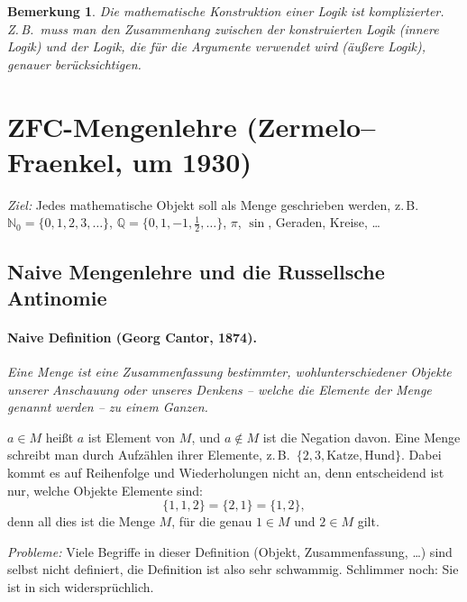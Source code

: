 \documentclass[a4paper]{article}
\theoremstyle{kurzskript}
\newtheorem*{bem}{Bemerkung}
\newcommand{\N}{\mathbb{N}}
\newcommand{\Q}{\mathbb{Q}}
\begin{document}
\begin{bem}
Die mathematische Konstruktion einer Logik ist komplizierter. Z.\,B.\ muss man den Zusammenhang zwischen der konstruierten Logik (\emph{innere Logik}) und der Logik, die für die Argumente verwendet wird (\emph{äußere Logik}), genauer berücksichtigen.
\end{bem}

\section{ZFC-Mengenlehre (Zermelo--Fraenkel, um 1930)}

\emph{Ziel:} Jedes mathematische Objekt soll als Menge geschrieben werden, z.\,B.\ $\N_0 = \{0, 1, 2, 3, \dots\}$, $\Q = \{0, 1, -1, \frac12, \dots\}$, $\pi$, $\sin$, Geraden, Kreise, \dots

\subsection{Naive Mengenlehre und die Russellsche Antinomie}

\paragraph{Naive Definition (Georg Cantor, 1874).}
\emph{Eine Menge ist eine Zusammenfassung bestimmter, wohlunterschiedener Objekte unserer Anschauung oder unseres Denkens -- welche die Elemente der Menge genannt werden -- zu einem Ganzen.}

$a \in M$ heißt \glqq$a$ ist Element von $M$\grqq, und $a \notin M$ ist die Negation davon. Eine Menge schreibt man durch Aufzählen ihrer Elemente, z.\,B.\ $\{2, 3, \text{Katze}, \text{Hund}\}$. Dabei kommt es auf Reihenfolge und Wiederholungen nicht an, denn entscheidend ist nur, welche Objekte Elemente sind:
\[
  \{1, 1, 2\} = \{2, 1\} = \{1, 2\},
\]
denn all dies ist die Menge $M$, für die genau $1 \in M$ und $2 \in M$ gilt.

\emph{Probleme:} Viele Begriffe in dieser Definition (\glqq Objekt\grqq, \glqq Zusammenfassung\grqq, \dots) sind selbst nicht definiert, die Definition ist also sehr schwammig. Schlimmer noch: Sie ist in sich widersprüchlich.
\end{document}
